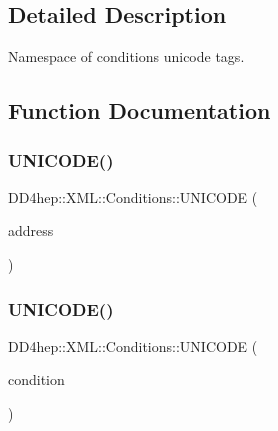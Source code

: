 \subsection{Detailed Description}
Namespace of conditions unicode tags. 

\subsection{Function Documentation}
\hypertarget{namespace_d_d4hep_1_1_x_m_l_1_1_conditions_a5373ad820618f7d952564658d2fc4cca}{}\label{namespace_d_d4hep_1_1_x_m_l_1_1_conditions_a5373ad820618f7d952564658d2fc4cca} 
\subsubsection{\texorpdfstring{U\+N\+I\+C\+O\+D\+E()}{UNICODE()}\hspace{0.1cm}{\footnotesize\ttfamily [1/11]}}
{\footnotesize\ttfamily D\+D4hep\+::\+X\+M\+L\+::\+Conditions\+::\+U\+N\+I\+C\+O\+DE (\begin{DoxyParamCaption}\item[{address}]{ }\end{DoxyParamCaption})}

\hypertarget{namespace_d_d4hep_1_1_x_m_l_1_1_conditions_ac093cd39504ee451f2fbcf994d26075d}{}\label{namespace_d_d4hep_1_1_x_m_l_1_1_conditions_ac093cd39504ee451f2fbcf994d26075d} 
\subsubsection{\texorpdfstring{U\+N\+I\+C\+O\+D\+E()}{UNICODE()}\hspace{0.1cm}{\footnotesize\ttfamily [2/11]}}
{\footnotesize\ttfamily D\+D4hep\+::\+X\+M\+L\+::\+Conditions\+::\+U\+N\+I\+C\+O\+DE (\begin{DoxyParamCaption}\item[{condition}]{ }\end{DoxyParamCaption})}

\hypertarget{namespace_d_d4hep_1_1_x_m_l_1_1_conditions_a093d9fab1388f560fa6d55926f5f83fd}{}\label{namespace_d_d4hep_1_1_x_m_l_1_1_conditions_a093d9fab1388f560fa6d55926f5f83fd} 
